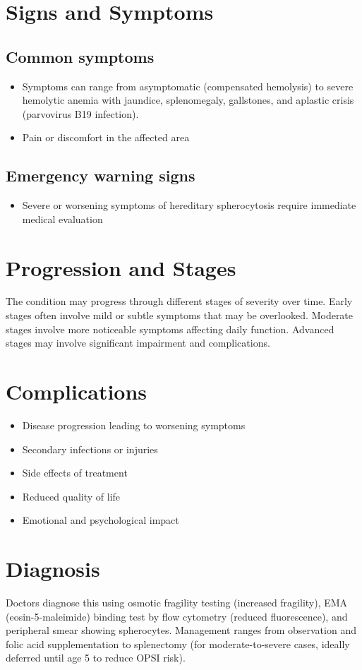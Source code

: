 \section{Signs and Symptoms}

\subsection{Common symptoms}
\begin{itemize}[noitemsep]
  \item Symptoms can range from asymptomatic (compensated hemolysis) to severe hemolytic anemia with jaundice, splenomegaly, gallstones, and aplastic crisis (parvovirus B19 infection).
  \item Pain or discomfort in the affected area
  \end{itemize}

\subsection{Emergency warning signs}
\begin{itemize}[noitemsep]
  \item Severe or worsening symptoms of hereditary spherocytosis require immediate medical evaluation
\end{itemize}
\section{Progression and Stages}
The condition may progress through different stages of severity over time. Early stages often involve mild or subtle symptoms that may be overlooked. Moderate stages involve more noticeable symptoms affecting daily function. Advanced stages may involve significant impairment and complications.
\section{Complications}
\begin{itemize}[noitemsep]
  \item Disease progression leading to worsening symptoms
  \item Secondary infections or injuries
  \item Side effects of treatment
  \item Reduced quality of life
  \item Emotional and psychological impact
\end{itemize}
\section{Diagnosis}
Doctors diagnose this using osmotic fragility testing (increased fragility), EMA (eosin-5-maleimide) binding test by flow cytometry (reduced fluorescence), and peripheral smear showing spherocytes. Management ranges from observation and folic acid supplementation to splenectomy (for moderate-to-severe cases, ideally deferred until age 5 to reduce OPSI risk).

